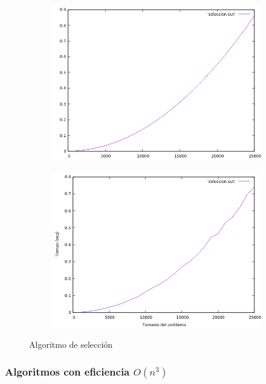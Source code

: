 \documentclass[12pt,spanish]{article}
\begin{document}
\begin{figure}[H]
\centering
\begin{subfigure}[b]{0.45\textwidth}
\includegraphics[scale=0.45]{empirica_seleccion.png}
\caption{}
\end{subfigure}
\quad
\begin{subfigure}[b]{0.45\textwidth}
\includegraphics[scale=0.45]{empirica_seleccion_2.png}
\caption{}
\end{subfigure}
\caption{Algoritmo de selección}
\end{figure}
\subsubsection{Algoritmos con eficiencia $O(n^3)$}
\end{document}
